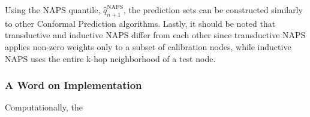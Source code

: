 Using the NAPS quantile, $\hat{q}^{\text{NAPS}}_{n+1}$, the prediction sets can be constructed similarly to other Conformal Prediction algorithms. Lastly, it should be noted that transductive and inductive NAPS differ from each other since transductive NAPS applies non-zero weights only to a subset of calibration nodes, while inductive NAPS uses the entire k-hop neighborhood of a test node.  

\subsubsection{A Word on Implementation}
Computationally, the 
